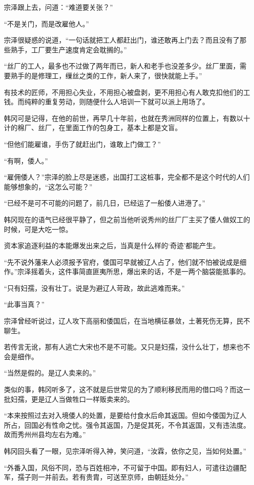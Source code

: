 宗泽跟上去，问道：“难道要关张？”

“不是关门，而是改雇他人。”

宗泽很疑惑的说道，“一句话就把工人都赶出门，谁还敢再上门去？而且没有了那些熟手，工厂要生产速度肯定会耽搁的。”

“丝厂的工人，最多也不过做了两年而已，新人和老手也没差多少。丝厂里面，需要熟手的是修理工，缫丝之类的工作，新人来了，很快就能上手。”

有技术的匠师，不用担心失业，不用担心被盘剥，更不用担心有人敢克扣他们的工钱。而纯粹的重复劳动，则随便什么人培训一下就可以派上用场了。

韩冈可是记得，在他的前世，再早几十年前，也就在秀洲同样的位置上，有数以十计的棉厂、丝厂，在里面工作的包身工，基本上都是文盲。

“但他们能雇谁，手伤了就赶出门，谁敢上门做工？”

“有啊，倭人。”

“雇佣倭人？”宗泽的脸上尽是迷惑，出国打工这桩事，完全都不是这个时代的人们能够想象的，“这怎么可能？”

“已经不是可不可能的问题了，前几日，已经运了一船倭人进港了。”

韩冈现在的语气已经很平静了，但之前当他听说秀州的丝厂厂主买了倭人做奴工的时候，可是大吃一惊。

资本家追逐利益的本能爆发出来之后，当真是什么样的‘奇迹’都能产生。

“先不说外藩来人必须报予官府，倭国可早就被辽人占了，他们就不怕被说成是细作。”宗泽摇着头，这件事简直匪夷所思，爆出来的话，不是一两个脑袋能抵事的。

“只有妇孺，没有壮丁。说是为避辽人苛政，故此逃难而来。”

“此事当真？”

宗泽曾经听说过，辽人攻下高丽和倭国后，在当地横征暴敛，土著死伤无算，民不聊生。

若传言无讹，那有人逃亡大宋也不是不可能。又只是妇孺，没什么壮丁，想来也不会是细作。

“当然是假的。是辽人卖来的。”

类似的事，韩冈听多了，这不就是后世常见的为了顺利移民而用的借口吗？而这一批妇孺，更是辽人当做牲口一样贩卖来的。

“本来按照过去对入境倭人的处置，是要给付食水后命其返国。但如今倭国为辽人所占，回国必有性命之忧。强令其返国，乃是促其死，不令其返国，又有违法度。故而秀州州县均左右为难。”

韩冈回头看了一眼，见宗泽听得入神，笑问道，“汝霖，依你之见，当如何处置。”

“外番入国，风俗不同，恐与百姓相冲，不可留于中国。即有妇人，可遣往边疆配军，孺子则一并前去。若有贵胄，可送至京师，由朝廷处分。”

